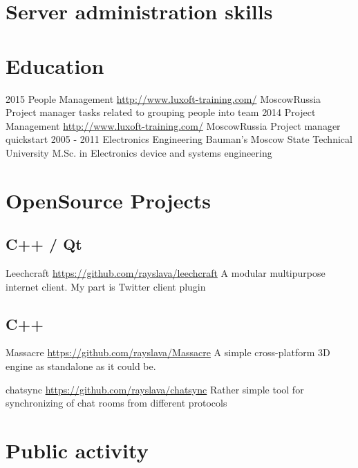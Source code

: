 \documentclass[11pt,a4paper]{moderncv}
\begin{document}




\section{Server administration skills}



\section{Education}
  \cventry
    {2015}
    {People Management}
    {\url{http://www.luxoft-training.com/}}
    {Moscow}{Russia}
    {Project manager tasks related to grouping people into team}
  \cventry
    {2014}
    {Project Management}
    {\url{http://www.luxoft-training.com/}}
    {Moscow}{Russia}
    {Project manager quickstart}
  \cventry
    {2005 - 2011}
    {Electronics Engineering}
    {Bauman's Moscow State Technical University}
    {}{}
    {M.Sc. in Electronics device and systems engineering}

\section{OpenSource Projects}
\subsection{C++ / Qt}
\cvitem
  {Leechcraft}
  {\url{https://github.com/rayslava/leechcraft}\newline{}
  A modular multipurpose internet client. My part is Twitter client plugin}

\subsection{C++}
\cvitem
  {Massacre}
  {\url{https://github.com/rayslava/Massacre}\newline{}
    A simple cross-platform 3D engine as standalone as it could be.}

\cvitem
  {chatsync}
  {\url{https://github.com/rayslava/chatsync}\newline{}
  Rather simple tool for synchronizing of chat rooms from different protocols}

\section{Public activity}
\end{document}
